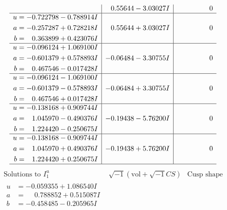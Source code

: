 \documentclass[1p]{elsarticle_modified}
\theoremstyle{definition}
\newcommand{\I}{\sqrt{-1}}
\begin{document}
$$\begin{array}{c|c|c}
 & \phantom{-}0.55644 - 3.03027 I & \phantom{-0.000000 } 0 \\ \hline\begin{aligned}
u &= -0.722798 - 0.788914 I \\
a &= -0.257287 + 0.728218 I \\
b &= \phantom{-}0.363899 + 0.423076 I\end{aligned}
 & \phantom{-}0.55644 + 3.03027 I & \phantom{-0.000000 } 0 \\ \hline\begin{aligned}
u &= -0.096124 + 1.069100 I \\
a &= -0.601379 + 0.578893 I \\
b &= \phantom{-}0.467546 - 0.017428 I\end{aligned}
 & -0.06484 - 3.30755 I & \phantom{-0.000000 } 0 \\ \hline\begin{aligned}
u &= -0.096124 - 1.069100 I \\
a &= -0.601379 - 0.578893 I \\
b &= \phantom{-}0.467546 + 0.017428 I\end{aligned}
 & -0.06484 + 3.30755 I & \phantom{-0.000000 } 0 \\ \hline\begin{aligned}
u &= -0.138168 + 0.909744 I \\
a &= \phantom{-}1.045970 - 0.490376 I \\
b &= \phantom{-}1.224420 - 0.250675 I\end{aligned}
 & -0.19438 - 5.76200 I & \phantom{-0.000000 } 0 \\ \hline\begin{aligned}
u &= -0.138168 - 0.909744 I \\
a &= \phantom{-}1.045970 + 0.490376 I \\
b &= \phantom{-}1.224420 + 0.250675 I\end{aligned}
 & -0.19438 + 5.76200 I & \phantom{-0.000000 } 0\\
 \hline 
 \end{array}$$\newpage$$\begin{array}{c|c|c}  
\text{Solutions to }I^u_{1}& \I (\text{vol} + \sqrt{-1}CS) & \text{Cusp shape}\\
 \hline 
\begin{aligned}
u &= -0.059355 + 1.086540 I \\
a &= \phantom{-}0.788852 + 0.515087 I \\
b &= -0.458485 - 0.205965 I\end{aligned}

\end{array}$$
\end{document}
